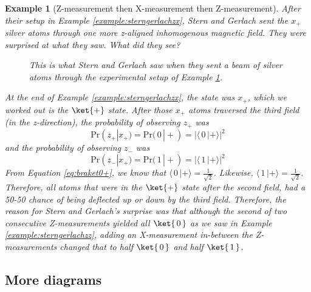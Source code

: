 \documentclass{article}
\newtheorem{example}{Example}
\theoremstyle{definition}
\newcommand{\abs}[1]{{\big\vert} #1 {\big\vert}}
\newcommand{\kz}[1]{\ket{\,#1\,}}
\newcommand{\kx}[1]{\ket{#1}}
\begin{document}
\begin{example}[Z-measurement then X-measurement then Z-measurement] \label{example:sterngerlachzxz}
	After their setup in Example \ref{example:sterngerlachzx}, Stern and Gerlach sent the $x_+$ silver atoms through one more z-aligned inhomogenous magnetic field.  They were surprised at what they saw.  What did they see?
	
	\begin{figure}[H]
		\caption{This is what Stern and Gerlach saw when they sent a beam of silver atoms through the experimental setup of Example \ref{example:sterngerlachzxz}.}
	\end{figure}

	\textnormal{At the end of Example \ref{example:sterngerlachzx}, the state was $x_+$, which we worked out is the $\kx+$ state.  After those $x_+$ atoms traversed the third field (in the z-direction), the probability of observing $z_+$ was
	\begin{equation}
		\text{Pr}(z_+|x_+) = \text{Pr}(\,0\,|+) = \abs{\langle\,0\,|+\rangle}^2
	\end{equation}
	and the probability of observing $z_-$ was
	\begin{equation}
		\text{Pr}(z_-|x_+) = \text{Pr}(\,1\,|+) = \abs{\langle\,1\,|+\rangle}^2
	\end{equation}
	From Equation \ref{eq:braket0+}, we know that $\langle\,0\,|+\rangle = \frac{1}{\sqrt{2}}$.  Likewise, $\langle\,1\,|+\rangle = \frac{1}{\sqrt{2}}$.  Therefore, all atoms that were in the $\kx+$ state after the second field, had a 50-50 chance of being deflected up or down by the third field.  Therefore, the reason for Stern and Gerlach's surprise was that although the second of two consecutive Z-measurements yielded all $\kz0$ as we saw in Example \ref{example:sterngerlachzz}, adding an X-measurement in-between the Z-measurements changed that to half $\kz0$ and half $\kz1$.}
\end{example}


\subsection{More diagrams}
\end{document}
